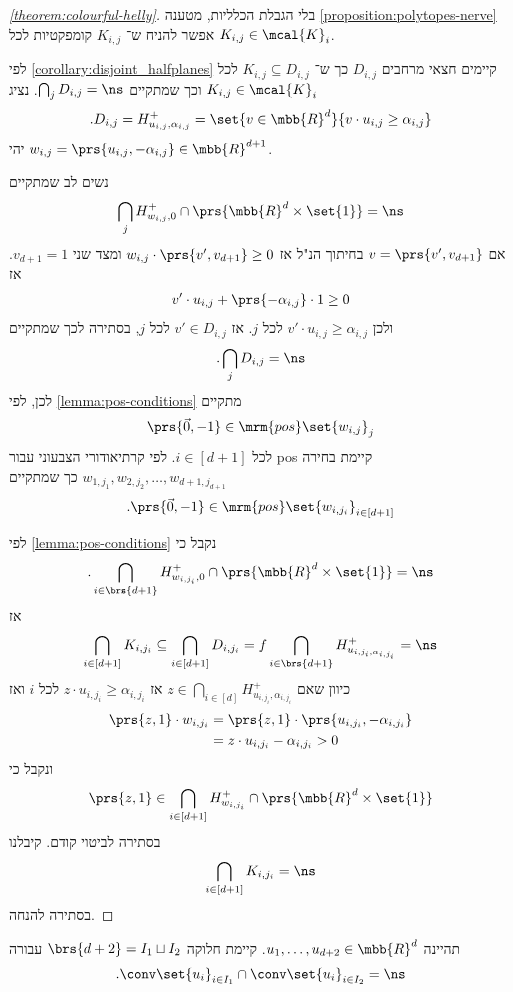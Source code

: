 \documentclass[a4paper,10pt,twoside,openany]{book}
\begin{document}
\begin{proof}[\ref{theorem:colourful-helly}]
בלי הגבלת הכלליות, מטענה
\ref{proposition:polytopes-nerve}
אפשר להניח ש־%
$K_{i,j}$
קומפקטיות לכל
$K_{i,j} \in \mcal{K}_i$.

לפי
\ref{corollary:disjoint_halfplanes}
קיימים חצאי מרחבים
$D_{i,j}$
כך ש־%
$K_{i,j} \subseteq D_{i,j}$
לכל
$K_{i,j} \in \mcal{K}_i$
וכך שמתקיים
$\bigcap_{j} D_{i,j} = \ns$.
נציג
\[\text{.} D_{i,j} = H_{u_{i,j}, \alpha_{i,j}}^+ = \set{v \in \mbb{R}^d}{v \cdot u_{i,j} \geq \alpha_{i,j}}\]
יהי
$w_{i,j} = \prs{u_{i,j}, -\alpha_{i,j}} \in \mbb{R}^{d+1}$.

נשים לב שמתקיים
\[\bigcap_j H_{w_{i,j}, 0}^+ \cap \prs{\mbb{R}^d \times \set{1}} = \ns\]
אם
$v = \prs{v', v_{d+1}}$
בחיתוך הנ"ל אז
$w_{i,j} \cdot \prs{v', v_{d+1}} \geq 0$
ומצד שני
$v_{d+1} = 1$.
אז
\begin{align*}
v' \cdot u_{i,j} + \prs{-\alpha_{i,j}} \cdot 1 \geq 0
\end{align*}
ולכן
$v' \cdot u_{i,j} \geq \alpha_{i,j}$
לכל
$j$.
אז
$v' \in D_{i,j}$
לכל
$j$,
בסתירה לכך שמתקיים
\[\text{.} \bigcap_j D_{i,j} = \ns\]
לכן, לפי
\ref{lemma:pos-conditions}
מתקיים
\[\prs{\vec{0}, -1} \in \mrm{pos}\set{w_{i,j}}_j\]
לכל
$i \in [d+1]$.
לפי קרתיאודורי הצבעוני עבור
\textenglish{pos}
קיימת בחירה
$w_{1, j_1}, w_{2,j_2}, \ldots, w_{d+1, j_{d+1}}$
כך שמתקיים
\[\text{.} \prs{\vec{0},-1} \in \mrm{pos}\set{w_{i,j_i}}_{i \in [d+1]}\]

לפי
\ref{lemma:pos-conditions}
נקבל כי
\[\text{.} \bigcap_{i \in \brs{d+1}} H_{w_{i,j_i},0}^+ \cap \prs{\mbb{R}^d \times \set{1}} = \ns\]
אז
\[\bigcap_{i \in [d+1]} K_{i, j_i} \subseteq \bigcap_{i \in [d+1]} D_{i, j_i} = f\bigcap_{i \in \brs{d+1}} H_{u_{i,j_i, \alpha_{i, j_i}}}^+ = \ns\]
כיוון שאם
$z \in \bigcap_{i \in [d]} H_{u_{i,j_i}, \alpha_{i,j_i}}^+$
אז
$z \cdot u_{i,j_i} \geq \alpha_{i,j_i}$
לכל
$i$
ואז
\begin{align*}
\prs{z,1} \cdot w_{i,j_i} &= \prs{z,1} \cdot \prs{u_{i,j_i}, -\alpha_{i,j_i}}
\\&= z \cdot u_{i, j_i} - \alpha_{i,j_i} > 0
\end{align*}
ונקבל כי
\[\prs{z,1} \in \bigcap_{i \in [d+1]} H_{w_{i,j_i}}^+ \cap \prs{\mbb{R}^d \times \set{1}}\]
בסתירה לביטוי קודם.
קיבלנו
\[\bigcap_{i \in [d+1]} K_{i, j_i} = \ns\]
בסתירה להנחה.
\end{proof}

\begin{theorem}[רדון]
תהיינה
$u_1, \ldots, u_{d+2} \in \mbb{R}^d$.
קיימת חלוקה
$\brs{d+2} = I_1 \sqcup I_2$
עבורה
\begin{align*}
\text{.} \conv\set{u_i}_{i \in I_1} \cap \conv\set{u_i}_{i \in I_2} = \ns
\end{align*}
\end{theorem}
\end{document}
